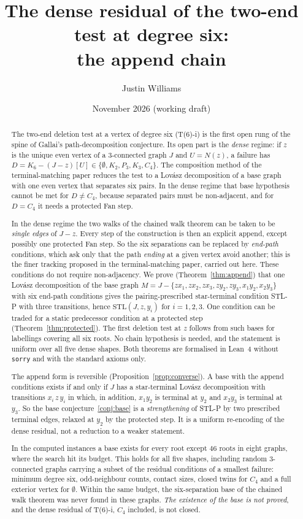 \documentclass[11pt]{amsart}
\title[The dense residual of T(6)-i]{The dense residual of the two-end test at degree six:\\
the append chain}
\author{Justin Williams}
\date{November 2026 (working draft)}
\theoremstyle{definition}
\newcommand{\STL}{\mathrm{STL}}
\begin{document}
\begin{abstract}
The two-end deletion test at a vertex of degree six (T(6)-i) is the first open rung of the
spine of Gallai's path-decomposition conjecture. Its open part is the \emph{dense} regime: if
$z$ is the unique even vertex of a $3$-connected graph $J$ and $U=N(z)$, a failure has
$D=K_6-(J-z)[U]\in\{\emptyset,K_2,P_3,K_3,C_4\}$. The composition method of the
terminal-matching paper reduces the test to a Lov\'asz decomposition of a base graph with one even
vertex that separates six pairs. In the dense regime that base hypothesis cannot be met for
$D\ne C_4$, because separated pairs must be non-adjacent, and for $D=C_4$ it needs a protected
Fan step.

In the dense regime the two walks of the chained walk theorem can be taken to be \emph{single
edges} of $J-z$. Every step of the construction is then an explicit append, except possibly one
protected Fan step. So the six separations can be replaced by \emph{end-path} conditions, which
ask only that the path \emph{ending} at a given vertex avoid another; this is the finer tracking
proposed in the terminal-matching paper, carried out here. These conditions do not require
non-adjacency. We prove (Theorem~\ref{thm:append}) that one Lov\'asz decomposition of the base
graph $M=J-\{zx_1,zx_2,zx_3,zy_2,zy_3,x_1y_2,x_2y_3\}$ with six end-path conditions gives the
pairing-prescribed star-terminal condition STL-P with three transitions, hence
$\STL(J,z,y_i)$ for $i=1,2,3$. One condition can be traded for a static predecessor condition
at a protected step (Theorem~\ref{thm:protected}). The first deletion test at $z$ follows from
such bases for labellings covering all six roots. No chain hypothesis is needed, and the
statement is uniform over all five dense shapes. Both theorems are formalised in Lean~4 without
\texttt{sorry} and with the standard axioms only.

The append form is reversible (Proposition~\ref{prop:converse}). A base with the append
conditions exists if and only if $J$ has a star-terminal Lov\'asz decomposition with
transitions $x_i\,z\,y_i$ in which, in addition, $x_1y_2$ is terminal at $y_2$ and $x_2y_3$ is
terminal at $y_3$. So the base conjecture~\ref{conj:base} is a \emph{strengthening} of STL-P
by two prescribed terminal edges, relaxed at $y_2$ by the protected step. It is a uniform
re-encoding of the dense residual, not a reduction to a weaker statement.

In the computed instances a base exists for every root except $46$ roots in eight graphs, where
the search hit its budget. This holds for all five shapes, including random $3$-connected graphs
carrying a subset of the residual conditions of a smallest failure: minimum degree six,
odd-neighbour counts, contact sizes, closed twins for $C_4$ and a full exterior vertex for
$\emptyset$. Within the same budget, the six-separation base of the chained walk theorem was
never found in these graphs. \emph{The existence of the base is not proved}, and the dense
residual of T(6)-i, $C_4$ included, is not closed.
\end{abstract}
\maketitle
\end{document}
